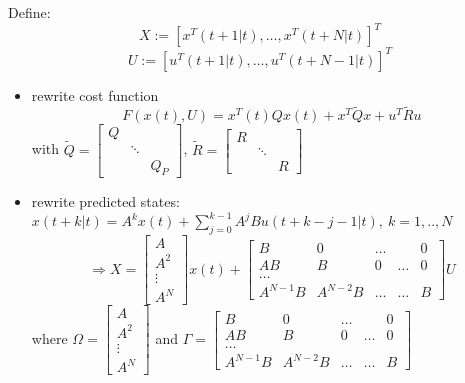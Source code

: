 Define: 
\begin{equation}
X:= [x^T(t+1|t), \dots, x^T(t+N|t)]^T
\end{equation}
\begin{equation}
U:= [u^T(t+1|t), \dots, u^T(t+N-1|t)]^T
\end{equation}
\begin{itemize}
\item rewrite cost function
\begin{equation}\label{cost_function}
F(x(t),U) = x^T(t)Qx(t) + x^T\tilde{Q}x + u^T\tilde{R}u
\end{equation}
with $\tilde{Q} = 
\begin{bmatrix}
    Q  & \  & \ \\
    \  &\ddots & \\
     \  & \ & Q_P     
\end{bmatrix} $, 
$\tilde{R} = 
\begin{bmatrix}
    R  & \  & \ \\
    \  &\ddots & \\
     \  & \ & R     
\end{bmatrix} $
\item rewrite predicted states: $x(t+k|t) = A^kx(t) + \sum_{j=0}^{k-1}A^jBu(t+k-j-1|t), \ k=1,..,N$
\begin{equation}\label{rewritten_state_input}
\Rightarrow X=\begin{bmatrix}
   A \\
   A^2 \\
   \vdots \\
   A^N   
\end{bmatrix}x(t) +\begin{bmatrix}
    B  & 0 & \dots &  & 0 \\
    AB & B & 0 & \dots & 0\\
    \hdots & & & & \\
    A^{N-1}B  & A^{N-2}B & \dots & \dots & B     
\end{bmatrix}U
\end{equation}
where $\Omega = \begin{bmatrix}
   A \\
   A^2 \\
   \vdots \\
   A^N   
\end{bmatrix}$ and $\Gamma = \begin{bmatrix}
    B  & 0 & \dots &  & 0 \\
    AB & B & 0 & \dots & 0\\
    \hdots & & & & \\
    A^{N-1}B  & A^{N-2}B & \dots & \dots & B     
\end{bmatrix}$


\end{itemize}
